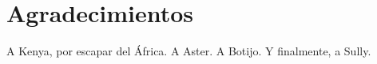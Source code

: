 
\chapter*{Agradecimientos}

A Kenya, por escapar del África.
A Aster.
A Botijo.
Y finalmente, a Sully.











